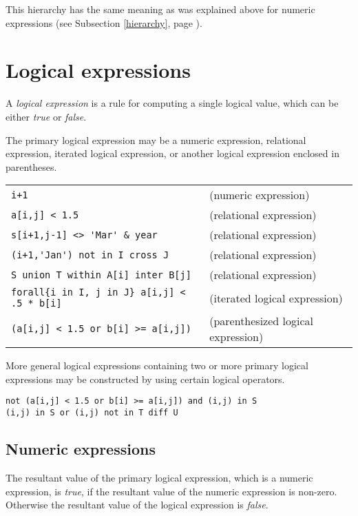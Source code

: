 \documentclass[11pt]{report}
\def\para#1{\noindent{\bf#1}}
\begin{document}
This hierarchy has the same meaning as was explained above for numeric
expressions (see Subsection \ref{hierarchy}, page \pageref{hierarchy}).

\newpage

\section{Logical expressions}

A {\it logical expression} is a rule for computing a single logical
value, which can be either {\it true} or {\it false}.

The primary logical expression may be a numeric expression, relational
expression, iterated logical expression, or another logical expression
enclosed in parentheses.

\para{Examples}

\noindent
\begin{tabular}{@{}ll@{}}
\verb|i+1| &(numeric expression)\\
\verb|a[i,j] < 1.5| &(relational expression)\\
\verb|s[i+1,j-1] <> 'Mar' & year | &(relational expression)\\
\verb|(i+1,'Jan') not in I cross J| &(relational expression)\\
\verb|S union T within A[i] inter B[j]| &(relational expression)\\
\verb|forall{i in I, j in J} a[i,j] < .5 * b[i]| &(iterated logical
expression)\\
\verb|(a[i,j] < 1.5 or b[i] >= a[i,j])| &(parenthesized logical
expression)\\
\end{tabular}

More general logical expressions containing two or more primary logical
expressions may be constructed by using certain logical operators.

\para{Examples}

\begin{verbatim}
not (a[i,j] < 1.5 or b[i] >= a[i,j]) and (i,j) in S
(i,j) in S or (i,j) not in T diff U
\end{verbatim}

\vspace*{-8pt}

\subsection{Numeric expressions}

The resultant value of the primary logical expression, which is a
numeric expression, is {\it true}, if the resultant value of the
numeric expression is non-zero. Otherwise the resultant value of the
logical expression is {\it false}.
\end{document}

